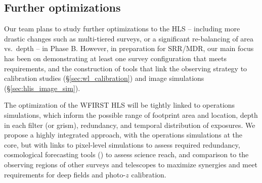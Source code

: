 \subsection{Further optimizations}

\begin{summaryii}
Our team plans to study further optimizations to the HLS -- including more
drastic changes such as multi-tiered surveys, or a significant re-balancing of
area vs.\ depth -- in Phase B. However, in preparation for SRR/MDR, our main
focus has been on demonstrating at least one survey configuration that meets
requirements, and the construction of tools that link the observing strategy to
calibration studies (\S\ref{sec:wl_calibration}) and image simulations (\S\ref{sec:hlis_image_sim}).
\end{summaryii}

The optimization of the WFIRST HLS will be tightly linked to operations simulations,
which inform the possible range of footprint area and location, depth in each filter (or grism), redundancy,
and temporal distribution of exposures. We propose a highly integrated approach, with the
operations simulations at the core, but with links to pixel-level simulations to assess required
redundancy, cosmological forecasting tools (\CoLi) to assess science reach, and comparison to the
observing regions of other surveys and telescopes to maximize synergies and meet requirements for
deep fields and photo-$z$ calibration.


%

